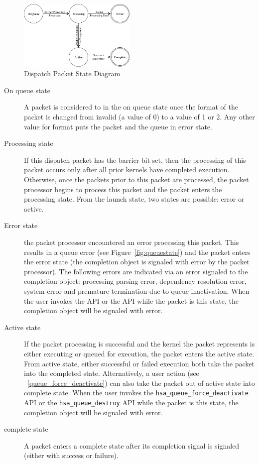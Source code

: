 \begin{figure}
  \centering
  \includegraphics[width=0.5\textwidth] {packetstate}
  \centering
  \caption{Dispatch Packet State Diagram}
  \label{fig:packetstate}
\end{figure}

\begin{description}
\item[On queue state] A packet is considered to in the on queue
state once the format of the packet is changed from invalid (a value
of 0) to a value of 1 or 2. Any other value for format puts the
packet and the queue in error state.

\item[Processing state] If this dispatch packet has the barrier bit
set, then the processing of this packet occurs only after all prior
kernels have completed execution.  Otherwise, once the packets prior
to this packet are processed, the packet processor begins to process
this packet and the packet enters the processing state.  From the
launch state, two states are possible: error or active.

\item[Error state] the packet processor encountered an error
processing this packet. This results in a queue error (see
Figure~\ref{fig:queuestate}) and the packet enters the error state
(the completion object is signaled with error by the packet
processor). The following errors are indicated via an error signaled
to the completion object: 
processing parsing error, dependency resolution error, system error
and premature termination due to queue inactivation.
When the user invokes the
 API or the
 API while the packet is this state, the
completion object will be signaled with error.

\item[Active state] If the packet processing is successful and the
kernel the packet represents is either executing or queued for
execution, the packet enters the active state. From active state,
either successful or failed execution both take the packet into the
completed state.  Alternatively, a user action (see
~\ref{queue_force_deactivate}) can also take the packet out of
active state into complete state.  When the user invokes the
\texttt{hsa\_queue\_force\_deactivate} API or the
\texttt{hsa\_queue\_destroy} API while the packet is this state, the
completion object will be signaled with error. 

\item[complete state] A packet enters a complete state after its
completion signal is signaled (either with success or failure).
\end{description}

